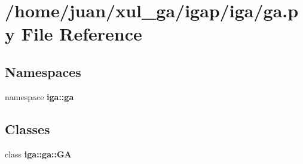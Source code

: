 \section{/home/juan/xul\_\-ga/igap/iga/ga.py File Reference}
\label{ga_8py}
\subsection*{Namespaces}
\begin{CompactItemize}
\item 
namespace {\bf iga::ga}
\end{CompactItemize}
\subsection*{Classes}
\begin{CompactItemize}
\item 
class {\bf iga::ga::GA}
\end{CompactItemize}
